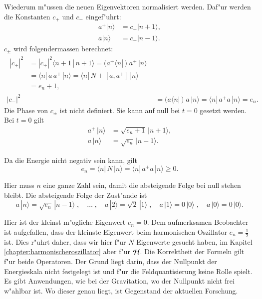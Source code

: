 \begin{refsection}
Wiederum m"ussen die neuen Eigenvektoren normalisiert werden. Daf"ur werden die Konstanten $c_+$ und $c_-$ eingef"uhrt:
\begin{align*}
a^+|n\rangle &= c_+|n+1\rangle, \\
a|n\rangle &= c_-|n-1\rangle.
\end{align*}
$c_\pm$ wird folgendermassen berechnet:
\begin{align*}
\begin{split}
	|c_+|^2 &= |c_+|^2 \langle n+1 \, | \, n+1 \rangle = ( a^+ \langle n |\,) \; a^+ \,| n \rangle \\
		&= \langle n |\, a \, a^+ \,|n \rangle = \langle n |\, N + [a,a^+] \,|n \rangle \\
		&= e_n+1,
\end{split}\\
	|c_-|^2 &= 	( a \langle n |\,) \; a \,| n \rangle = \langle n |\, a^+ a \,| n \rangle = e_n.
\end{align*}
Die Phase von $c_{\pm}$ ist nicht definiert. Sie kann auf null bei $t=0$ gesetzt werden. Bei $t=0$ gilt
\begin{align*}
a^+\,|n\rangle &= \sqrt{e_n+1}\,|n+1\rangle, \\
a\,|n\rangle &= \sqrt{e_n}\,|n-1\rangle.
\end{align*}

Da die Energie nicht negativ sein kann, gilt
\begin{equation*}
e_n = \langle n |\, N \,|n \rangle = \langle n |\, a^+a \,|n \rangle \geq 0.
\end{equation*}

Hier muss $n$ eine ganze Zahl sein, damit die absteigende Folge bei null stehen bleibt. Die absteigende Folge der Zust"ande ist
\begin{equation*}
a\,|n\rangle = \sqrt{e_n}\,|n-1\rangle  \;, \quad \hdots \; , \quad a\,|2\rangle = \sqrt{2}\,|1\rangle \; , \quad a\,|1\rangle = 0\,|0\rangle \;, \quad a\,|0\rangle = 0\,|0\rangle.
\end{equation*}

Hier ist der kleinst m"ogliche Eigenwert $e_n = 0$. Dem aufmerksamen Beobachter ist aufgefallen, dass der kleinste Eigenwert beim harmonischen Oszillator $e_n = \frac{1}{2}$ ist. Dies r"uhrt daher, dass wir hier f"ur $N$ Eigenwerte gesucht haben, im Kapitel \ref{chapter:harmonischeroszillator} aber f"ur ${\cal H}$. Die Korrektheit der Formeln gilt f"ur beide Operatoren. Der Grund liegt darin, dass der Nullpunkt der Energieskala nicht festgelegt ist und f"ur die Feldquantisierung keine Rolle spielt. Es gibt Anwendungen, wie bei der Gravitation, wo der Nullpunkt nicht frei w"ahlbar ist. Wo dieser genau liegt, ist Gegenstand der aktuellen Forschung.


\end{refsection}

